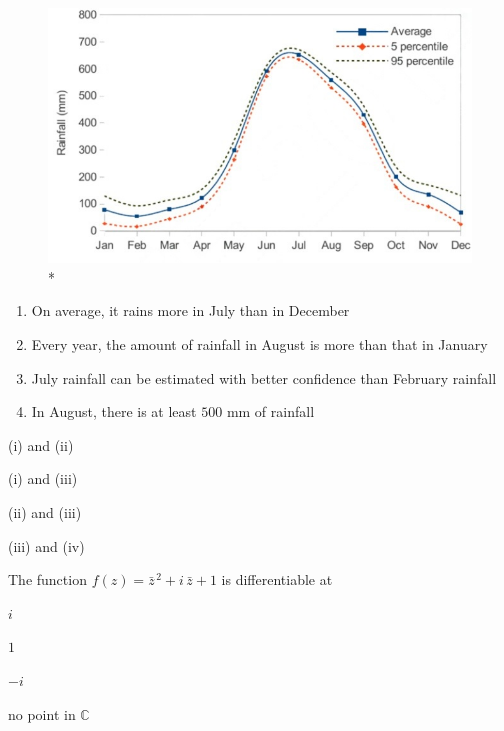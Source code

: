 \documentclass[journal,12pt,onecolumn]{IEEEtran}
\theoremstyle{remark}
\begin{document}
\begin{enumerate}
{\begin{figure}[h!]
\centering
\includegraphics[width=.85\linewidth]{figs/FIG1.png}
\caption{*}
\label{fig:placeholder}
\end{figure}

\begin{enumerate}
\item On average, it rains more in July than in December
\item Every year, the amount of rainfall in August is more than that in January
\item July rainfall can be estimated with better confidence than February rainfall
\item In August, there is at least $500$ mm of rainfall
\end{enumerate}

\begin{enumerate}
\begin{multicols}{2}
\item (i) and (ii)
\item (i) and (iii)
\item (ii) and (iii)
\item (iii) and (iv)
\end{multicols}
\end{enumerate}


\item The function $f(z)=\bar z^{\,2}+i\,\bar z+1$ is differentiable at

\hfill{}

\begin{enumerate}
\begin{multicols}{4}
\item $i$
\item $1$
\item $-i$
\item no point in $\mathbb{C}$
\end{multicols}
\end{enumerate}


}
\end{enumerate}
\end{document}
